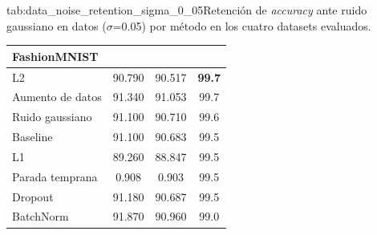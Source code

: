 \begin{table}{tab:data_noise_retention_sigma_0_05}{Retención de \textit{accuracy} ante ruido gaussiano en datos ($\sigma$=0.05) por método en los cuatro datasets evaluados.}
\begin{tabular}{lccc}
\midrule
\multicolumn{4}{l}{\textbf{FashionMNIST}}\\
\midrule
L2 & 90.790 & 90.517 & \textbf{99.7} \\
Aumento de datos & 91.340 & 91.053 & 99.7 \\
Ruido gaussiano & 91.100 & 90.710 & 99.6 \\
Baseline & 91.100 & 90.683 & 99.5 \\
L1 & 89.260 & 88.847 & 99.5 \\
Parada temprana & 0.908 & 0.903 & 99.5 \\
Dropout & 91.180 & 90.687 & 99.5 \\
BatchNorm & 91.870 & 90.960 & 99.0 \\
\bottomrule
\end{tabular}
\end{table}